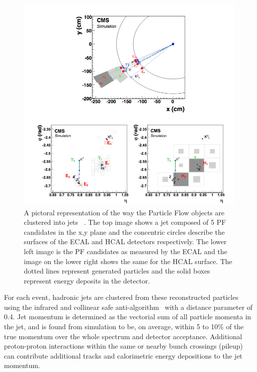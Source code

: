 \begin{figure}[htb]
\centering
\includegraphics[width=1.0\textwidth]{Chapter-1/cmsPflowjet.png}
\caption{A pictoral representation of the way the Particle Flow objects are clustered into jets ~\cite{Sirunyan:2017ulk}. The top image shows a jet composed of 5 PF candidates in the x,y plane and the concentric circles describe the surfaces of the ECAL and HCAL detectors respectively. The lower left image is the PF candidates as measured by the ECAL and the image on the lower right shows the same for the HCAL surface. The dotted lines represent generated particles and the solid boxes represent energy deposits in the detector. }
\label{fig:cmsPFjet}
\end{figure}

For each event, hadronic jets are clustered from these reconstructed particles using the infrared and collinear safe anti-\kt algorithm~\cite{Cacciari:2008gp, Cacciari:2011ma} with a distance parameter of 0.4. Jet momentum is determined as the vectorial sum of all particle momenta in the jet, and is found from simulation to be, on average, within 5 to 10\% of the true momentum over the whole \pt spectrum and detector acceptance. Additional proton-proton interactions within the same or nearby bunch crossings (pileup) can contribute additional tracks and calorimetric energy depositions to the jet momentum. 

